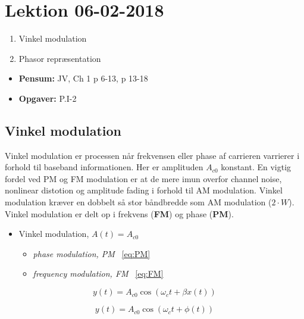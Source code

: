 \section{Lektion 06-02-2018}

\begin{enumerate}
	\item Vinkel modulation
	\item Phasor repræsentation
\end{enumerate}

\begin{mdframed}[style=exampledefault]
	\begin{itemize}
		\item \textbf{Pensum:} JV, Ch 1 p 6-13, p 13-18
		\item \textbf{Opgaver:} P.I-2
	\end{itemize}
\end{mdframed}

\subsection{Vinkel modulation}
Vinkel modulation er processen når frekvensen eller phase af carrieren varrierer i forhold til baseband informationen. Her er amplituden $A_{c0}$ konstant. En vigtig fordel ved PM og FM modulation er at de mere imun overfor channel noise, nonlinear distotion og amplitude fading i forhold til AM modulation. Vinkel modulation kræver en dobbelt så stor båndbredde som AM modulation ($2\cdot W$). \\

\noindent Vinkel modulation er delt op i frekvens (\textbf{FM}) og phase (\textbf{PM}).

\begin{itemize}
	\item Vinkel modulation, $A(t) = A_{c0}$
	\begin{itemize}
		\item \textit{phase modulation, PM} ~\ref{eq:PM}
		\item \textit{frequency modulation, FM} ~\ref{eq:FM}
	\end{itemize}
\end{itemize} 

\begin{equation}\label{eq:PM}
y(t) = A_{c0} \cos(\omega_c t + \beta x(t))
\end{equation}

\begin{equation}\label{eq:FM}
y(t) = A_{c0} \cos(\omega_c t + \phi(t))
\end{equation}


